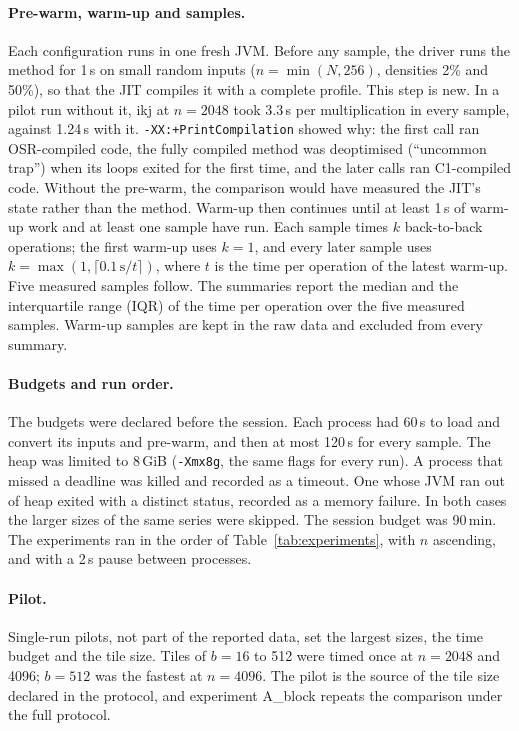 \documentclass[11pt,a4paper]{article}
\begin{document}
\paragraph{Pre-warm, warm-up and samples.} Each configuration runs in one fresh
JVM. Before any sample, the driver runs the method for 1\,s on small random
inputs ($n=\min(N,256)$, densities 2\% and 50\%), so that the JIT compiles it
with a complete profile. This step is new. In a pilot run without it, ikj at
$n=2048$ took 3.3\,s per multiplication in every sample, against 1.24\,s with
it. \texttt{-XX:+PrintCompilation} showed why: the first call ran OSR-compiled
code, the fully compiled method was deoptimised (``uncommon trap'') when its
loops exited for the first time, and the later calls ran C1-compiled code.
Without the pre-warm, the comparison would have measured the JIT's state rather
than the method. Warm-up then continues until at least 1\,s of warm-up work and
at least one sample have run. Each sample times $k$ back-to-back operations; the
first warm-up uses $k=1$, and every later sample uses
$k=\max(1,\lceil 0.1\,\text{s}/t\rceil)$, where $t$ is the time per operation of
the latest warm-up. Five measured samples follow. The summaries report the
median and the interquartile range (IQR) of the time per operation over the
five measured samples. Warm-up samples are kept in the raw data and excluded
from every summary.

\paragraph{Budgets and run order.} The budgets were declared before the session.
Each process had 60\,s to load and convert its inputs and pre-warm, and then at
most 120\,s for every sample. The heap was limited to 8\,GiB
(\texttt{-Xmx8g}, the same flags for every run). A process that missed a
deadline was killed and recorded as a timeout. One whose JVM ran out of heap
exited with a distinct status, recorded as a memory failure. In both cases the
larger sizes of the same series were skipped. The session budget was 90\,min. The
experiments ran in the order of Table~\ref{tab:experiments}, with $n$ ascending,
and with a 2\,s pause between processes.

\paragraph{Pilot.} Single-run pilots, not part of the reported data, set the
largest sizes, the time budget and the tile size. Tiles of $b=16$ to 512 were
timed once at $n=2048$ and 4096; $b=512$ was the fastest at $n=4096$. The pilot
is the source of the tile size declared in the protocol, and experiment A\_block
repeats the comparison under the full protocol.
\end{document}
